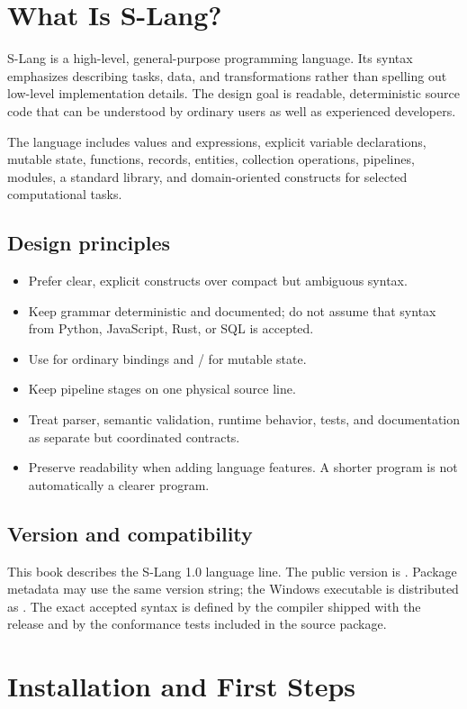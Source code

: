 \documentclass[11pt,a4paper,oneside]{book}
\newcommand{\slang}{\textsf{S-Lang}}
\newcommand{\code}[1]{\texttt{\detokenize{#1}}}
\begin{document}
\chapter{What Is S-Lang?}
\slang{} is a high-level, general-purpose programming language. Its syntax emphasizes describing tasks, data, and transformations rather than spelling out low-level implementation details. The design goal is readable, deterministic source code that can be understood by ordinary users as well as experienced developers.

The language includes values and expressions, explicit variable declarations, mutable state, functions, records, entities, collection operations, pipelines, modules, a standard library, and domain-oriented constructs for selected computational tasks.

\section{Design principles}
\begin{itemize}
\item Prefer clear, explicit constructs over compact but ambiguous syntax.
\item Keep grammar deterministic and documented; do not assume that syntax from Python, JavaScript, Rust, or SQL is accepted.
\item Use \code{let} for ordinary bindings and \code{state}/\code{set} for mutable state.
\item Keep pipeline stages on one physical source line.
\item Treat parser, semantic validation, runtime behavior, tests, and documentation as separate but coordinated contracts.
\item Preserve readability when adding language features. A shorter program is not automatically a clearer program.
\end{itemize}

\section{Version and compatibility}
This book describes the S-Lang 1.0 language line. The public version is \code{1.0}. Package metadata may use the same version string; the Windows executable is distributed as \code{slang1.0.exe}. The exact accepted syntax is defined by the compiler shipped with the release and by the conformance tests included in the source package.

\chapter{Installation and First Steps}
\end{document}
